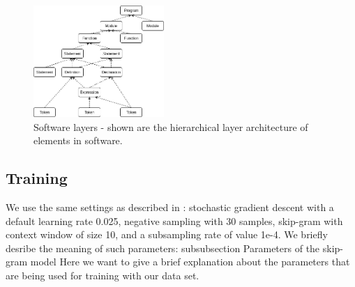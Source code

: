 \begin{table}
	
	
	\caption{Overview of our training data set}
	\label{tab:dataset}
\end{table}
\begin{figure}[t!]
	\includegraphics[width=0.44\textwidth]{software_layers}
	
	\caption{Software layers - shown are the hierarchical layer architecture of elements in software.}
	\label{figure:softwarelayers}
	\medskip
\end{figure}
\subsection{Training}
We use the same settings as described in \cite{mikolov2013distributed}: stochastic gradient descent with a default learning rate 0.025, negative sampling with 30 samples, skip-gram with context window of size 10, and a subsampling rate of value 1e-4. We briefly desribe the meaning of such parameters:
subsubsection{ Parameters of the skip-gram model}
Here we want to give a brief explanation about the parameters that are being used for training with our data set.

